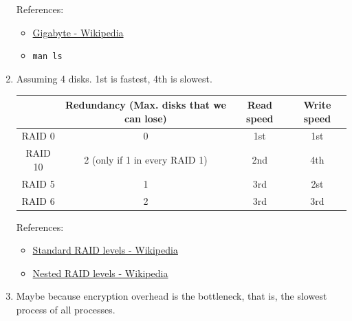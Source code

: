 \documentclass[12pt, a4paper]{article}
\begin{document}
\begin{enumerate}[label=(\alph*)]
      References:
      \begin{itemize}
        \item \href{https://en.wikipedia.org/wiki/Gigabyte}{Gigabyte - Wikipedia}
        \item \verb|man ls|
      \end{itemize}

    \item Assuming 4 disks. 1st is fastest, 4th is slowest.
      \begin{table}[H]
        \centering
        \begin{tabular}{|c|c|c|c|}
        \hline
        & Redundancy (Max. disks that we can lose) & Read speed & Write speed \\\hline
        RAID 0 & 0 & 1st & 1st \\\hline
        RAID 10 & 2 (only if 1 in every RAID 1) & 2nd & 4th \\\hline
        RAID 5 & 1 & 3rd & 2st \\\hline
        RAID 6 & 2 & 3rd & 3rd \\\hline
        \end{tabular}
      \end{table}

      References:
      \begin{itemize}
        \item \href{https://en.wikipedia.org/wiki/Standard_RAID_levels}{Standard RAID levels - Wikipedia}
        \item \href{https://en.wikipedia.org/wiki/Nested_RAID_levels#RAID_10}{Nested RAID levels - Wikipedia}
      \end{itemize}

    \item Maybe because encryption overhead is the bottleneck, that is, the
      slowest process of all processes.
  \end{enumerate}
\end{document}
